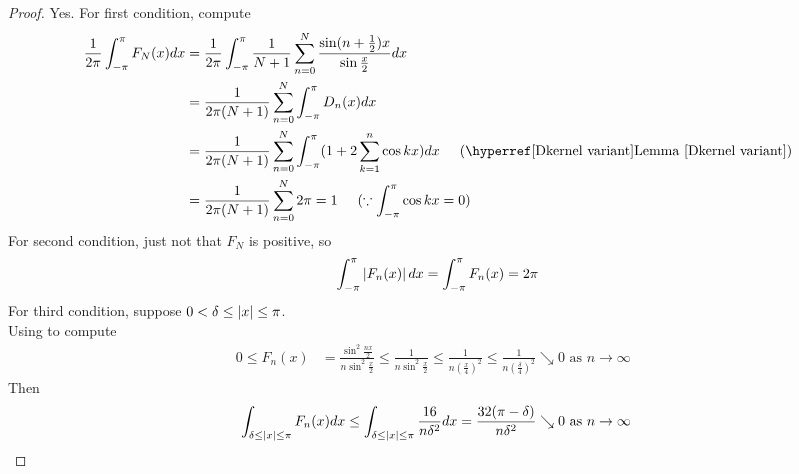 \documentclass{report}
\begin{document}
\begin{proof}
Yes. For first condition, compute 
\begin{align*}
\frac{1}{2\pi}\int_{-\pi}^\pi F_N(x)dx&=\frac{1}{2\pi}\int_{-\pi}^{\pi} \frac{1}{N+1}\sum_{n=0}^N \frac{\sin (n+\frac{1}{2})x}{\sin \frac{x}{2}}dx\\
&=\frac{1}{2\pi (N+1)}\sum_{n=0}^N \int_{-\pi}^{\pi} D_n(x)dx\\
&=\frac{1}{2\pi (N+1)}\sum_{n=0}^N \int_{-\pi}^{\pi} (1+2 \sum_{k=1}^n \cos kx)dx\hspace{0.5cm}(\text{\myref{Lemma}{Dkernel variant}})\\
&=\frac{1}{2\pi(N+1)}\sum_{n=0}^N 2\pi=1\hspace{0.5cm}(\because \int_{-\pi}^{\pi}\cos kx=0)
\end{align*}
For second condition, just not that $F_N$ is positive, so 
\begin{align*}
\int_{-\pi}^{\pi}\left|F_n(x)\right|dx=\int_{-\pi}^{\pi}F_n(x)=2\pi
\end{align*}
For third condition, suppose $0<\delta \leq \left|x\right|\leq \pi$.\\

Using  to compute 
\begin{align*}
0\leq F_n(x)&=\frac{\sin^2 \frac{nx}{2}}{n \sin^2 \frac{x}{2}}\leq \frac{1}{n \sin^2 \frac{x}{2}}\leq \frac{1}{n(\frac{x}{4})^2}\leq \frac{1}{n(\frac{\delta}{4})^2}\searrow 0\text{ as $n\to \infty$ }
\end{align*}
Then 
\begin{align*}
\int_{\delta\leq \left|x\right|\leq \pi}F_n(x)dx\leq \int_{\delta\leq \left|x\right|\leq \pi} \frac{16}{n\delta^2}dx=\frac{32(\pi-\delta)}{n \delta^2}\searrow 0\text{ as $n\to \infty$ }
\end{align*}


\end{proof}
\end{document}
